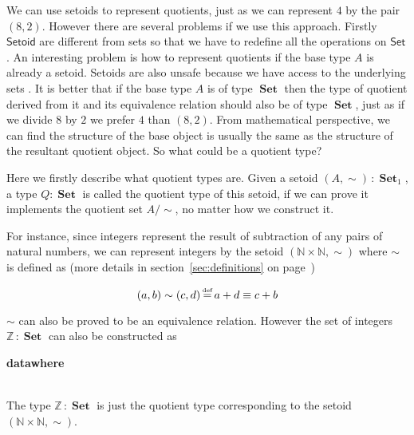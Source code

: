 \documentclass{article}
\newcommand{\Conid}[1]{\mathit{#1}}
\newcommand{\Varid}[1]{\mathit{#1}}
\def\resethooks{%
  \global\let\SaveRestoreHook\empty
  \global\let\ColumnHook\empty}
\newcommand{\hsindent}[1]{\quad}%
\let\hspre\empty
\let\hspost\empty
\renewcommand\Varid[1]{\mathord{\textsf{#1}}}
\let\Conid\Varid
\newcommand\Keyword[1]{\textsf{\textbf{#1}}}
\theoremstyle{definition}
\newcommand{\N}{\mathbb{N}}
\newcommand{\Z}{\mathbb{Z}}
\DeclareMathOperator{\Set}{\mathbf{Set}}
\DeclareMathOperator{\defi}{\stackrel{\text{\tiny def}}{=}}
\begin{document}
We can use setoids to represent quotients, just as we can represent
$4$ by the pair $(8,2)$. However there are several problems if we use
this approach. Firstly \ensuremath{\Conid{Setoid}} are
different from sets so that we have to redefine all the operations on
\ensuremath{\Conid{Set}}. An interesting problem is how to represent quotients if the base
type $A$ is already a setoid. Setoids are also unsafe because we have access to the underlying
 sets \cite{aan}. 
It is better that if the base type $A$ is of type $\Set$ then the type of
quotient derived from it and its equivalence relation should also be
of type $\Set$, just as if we divide $8$ by $2$ we prefer $4$ than
$(8,2)$. From mathematical perspective, we can find the structure of the base object is usually the same as the
structure of the resultant quotient object. So what could be a quotient type?

Here we firstly describe what quotient types are. Given a setoid
$(A,\sim)\,\colon\Set_1$, a type $Q : \Set$ is called the quotient
type of this setoid, if we can prove it implements the quotient set
$A/\sim$, no matter how we construct it.

For instance, since integers represent the result of subtraction of
any pairs of natural numbers, we can represent integers by the setoid $(\N\times\N , \sim)$ where $\sim$ is
defined as (more details in section~\ref{sec:definitions} on page~\pageref{sec:definitions})

\[(a , b) \sim (c , d) \defi  a + d \equiv c + b \]

$\sim$ can also be proved to be an equivalence relation. However the
set of integers $\Z\,\colon\Set$ can also be constructed as 

\begin{hscode}\SaveRestoreHook
\column{B}{@{}>{\hspre}l<{\hspost}@{}}%
\column{3}{@{}>{\hspre}l<{\hspost}@{}}%
\column{E}{@{}>{\hspre}l<{\hspost}@{}}%
\>[B]{}\Keyword{data}\;\Conid{ℤ}\;\mathbin{:}\;\Conid{Set}\;\Keyword{where}{}\<[E]%
\\
\>[B]{}\hsindent{3}{}\<[3]%
\>[3]{}\Varid{+\char95 }\;\mathbin{:}\;\Conid{ℕ}\;\Varid{→}\;\Conid{ℤ}{}\<[E]%
\\
\>[B]{}\hsindent{3}{}\<[3]%
\>[3]{}\Varid{-suc\char95 }\;\mathbin{:}\;\Conid{ℕ}\;\Varid{→}\;\Conid{ℤ}{}\<[E]%
\ColumnHook
\end{hscode}\resethooks

The type $\Z\,\colon\Set$  is just the quotient type corresponding to
the setoid  $(\N\times\N , \sim)$. 
\end{document}

